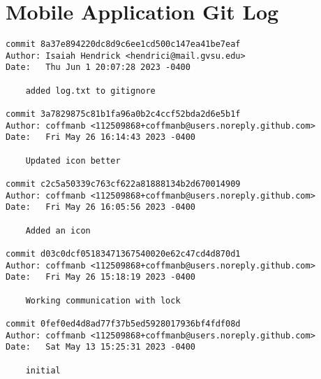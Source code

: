 \section{Mobile Application Git Log}
\hypertarget{applog}{}
\begin{verbatim}
commit 8a37e894220dc8d9c6ee1cd500c147ea41be7eaf
Author: Isaiah Hendrick <hendrici@mail.gvsu.edu>
Date:   Thu Jun 1 20:07:28 2023 -0400

    added log.txt to gitignore

commit 3a7829875c81b1fa96a0b2c4ccf52bda2d6e5b1f
Author: coffmanb <112509868+coffmanb@users.noreply.github.com>
Date:   Fri May 26 16:14:43 2023 -0400

    Updated icon better

commit c2c5a50339c763cf622a81888134b2d670014909
Author: coffmanb <112509868+coffmanb@users.noreply.github.com>
Date:   Fri May 26 16:05:56 2023 -0400

    Added an icon

commit d03c0dcf05183471367540020e62c47cd4d870d1
Author: coffmanb <112509868+coffmanb@users.noreply.github.com>
Date:   Fri May 26 15:18:19 2023 -0400

    Working communication with lock

commit 0fef0ed4d8ad77f37b5ed5928017936bf4fdf08d
Author: coffmanb <112509868+coffmanb@users.noreply.github.com>
Date:   Sat May 13 15:25:31 2023 -0400

    initial

\end{verbatim}